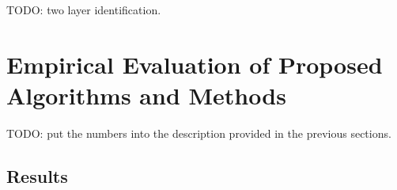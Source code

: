 \documentclass{IEEEtran}
\begin{document}
TODO: two layer identification. 

\section{Empirical Evaluation of Proposed Algorithms and Methods}
\label{Evaluation}

% 
%

TODO: put the numbers into the description provided in the previous sections. 

\subsection{Results}
\end{document}

